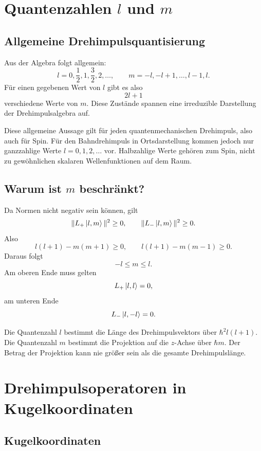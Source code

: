 \section{Quantenzahlen \(l\) und \(m\)}

\subsection{Allgemeine Drehimpulsquantisierung}

Aus der Algebra folgt allgemein:
\[
    l=0,\frac12,1,\frac32,2,\dots,
    \qquad
    m=-l,-l+1,\dots,l-1,l.
\]
Für einen gegebenen Wert von \(l\) gibt es also
\[
    2l+1
\]
verschiedene Werte von \(m\). Diese Zustände spannen eine irreduzible Darstellung der Drehimpulsalgebra auf.

\begin{notebox}
Diese allgemeine Aussage gilt für jeden quantenmechanischen Drehimpuls, also auch für Spin. Für den Bahndrehimpuls in Ortsdarstellung kommen jedoch nur ganzzahlige Werte \(l=0,1,2,\dots\) vor. Halbzahlige Werte gehören zum Spin, nicht zu gewöhnlichen skalaren Wellenfunktionen auf dem Raum.
\end{notebox}

\subsection{Warum ist \(m\) beschränkt?}

Da Normen nicht negativ sein können, gilt
\[
    \|L_+\left|l,m\right\rangle\|^2\geq 0,
    \qquad
    \|L_-\left|l,m\right\rangle\|^2\geq 0.
\]
Also
\[
    l(l+1)-m(m+1)\geq 0,
    \qquad
    l(l+1)-m(m-1)\geq 0.
\]
Daraus folgt
\[
    -l\leq m\leq l.
\]
Am oberen Ende muss gelten
\[
    L_+\left|l,l\right\rangle=0,
\]
am unteren Ende
\[
    L_-\left|l,-l\right\rangle=0.
\]

\begin{conceptbox}
Die Quantenzahl \(l\) bestimmt die Länge des Drehimpulsvektors über \(\hbar^2l(l+1)\). Die Quantenzahl \(m\) bestimmt die Projektion auf die \(z\)-Achse über \(\hbar m\). Der Betrag der Projektion kann nie größer sein als die gesamte Drehimpulslänge.
\end{conceptbox}

\section{Drehimpulsoperatoren in Kugelkoordinaten}

\subsection{Kugelkoordinaten}

